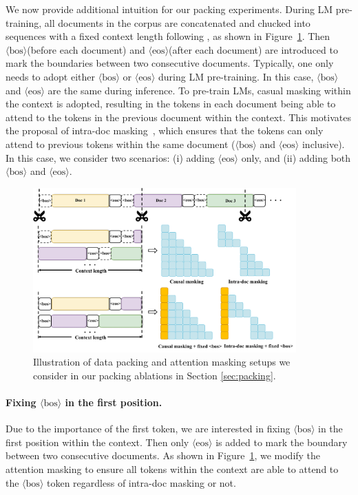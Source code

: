 \documentclass{article} %
\newcommand{\bos}{\ensuremath{\langle\text{bos}\rangle}\xspace}
\newcommand{\eos}{\ensuremath{\langle\text{eos}\rangle}\xspace}
\begin{document}
We now provide additional intuition for our packing experiments. During LM pre-training, all documents in the corpus are concatenated and chucked into sequences with a fixed context length following \citet{brown2020language}, as shown in Figure~\ref{fig:data_packing}.  Then \bos (before each document) and \eos (after each document) are introduced to mark the boundaries between two consecutive documents. Typically, one only needs to adopt either \bos or \eos during LM pre-training. In this case, \bos and \eos are the same during inference.  To pre-train LMs, casual masking within the context is adopted, resulting in the tokens in each document being able to attend to the tokens in the previous document within the context. This motivates the proposal of intra-doc masking~\citep{dubey2024llama, zhao2024analysing}, which ensures that the tokens can only attend to previous tokens within the same document (\bos and \eos inclusive). In this case, we consider two scenarios: (i) adding \eos only, and (ii) adding both \bos and \eos. 

\begin{figure}[H]
    \centering
    \includegraphics[width=0.9\textwidth]{figures/packing/data_packing.pdf} %
    \caption{Illustration of data packing and attention masking setups we consider in our packing ablations in Section \ref{sec:packing}.}%
    \label{fig:data_packing}%
\end{figure}

\paragraph{Fixing \bos in the first position.} Due to the importance of the first token, we are interested in fixing \bos in the first position within the context. Then only \eos is added to mark the boundary between two consecutive documents. As shown in Figure~\ref{fig:data_packing}, we modify the attention masking to ensure all tokens within the context are able to attend to the \bos token regardless of intra-doc masking or not.
\end{document}
